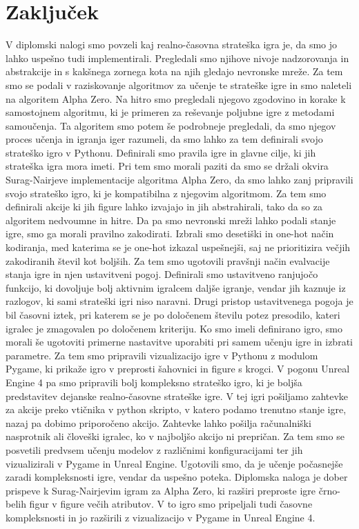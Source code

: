 \documentclass[a4paper, 12pt]{book}
\begin{document}
\chapter{Zaključek}
\label{chzakljucek}
V diplomski nalogi smo povzeli kaj realno-časovna strateška igra je, da smo jo lahko uspešno tudi implementirali.
Pregledali smo njihove nivoje nadzorovanja in abstrakcije in s kakšnega zornega kota na njih gledajo nevronske mreže.
Za tem smo se podali v raziskovanje algoritmov za učenje te strateške igre in smo naleteli na algoritem Alpha Zero.
Na hitro smo pregledali njegovo zgodovino in korake k samostojnem algoritmu, ki je primeren za reševanje poljubne igre z metodami samoučenja.
Ta algoritem smo potem še podrobneje pregledali, da smo njegov proces učenja in igranja iger razumeli, da smo lahko za tem definirali svojo strateško igro v Pythonu.
Definirali smo pravila igre in glavne cilje, ki jih strateška igra mora imeti.
Pri tem smo morali paziti da smo se držali okvira Surag-Nairjeve implementacije algoritma Alpha Zero, da smo lahko zanj pripravili svojo strateško igro, ki je kompatibilna z njegovim algoritmom.
Za tem smo definirali akcije ki jih figure lahko izvajajo in jih abstrahirali, tako da so za algoritem nedvoumne in hitre.
Da pa smo nevronski mreži lahko podali stanje igre, smo ga morali pravilno zakodirati.
Izbrali smo desetiški in one-hot način kodiranja, med katerima se je one-hot izkazal uspešnejši, saj ne prioritizira večjih zakodiranih števil kot boljših.
Za tem smo ugotovili pravšnji način evalvacije stanja igre in njen ustavitveni pogoj.
Definirali smo ustavitveno ranjujočo funkcijo, ki dovoljuje bolj aktivnim igralcem daljše igranje, vendar jih kaznuje iz razlogov, ki sami strateški igri niso naravni.
Drugi pristop ustavitvenega pogoja je bil časovni iztek, pri katerem se je po določenem številu potez presodilo, kateri igralec je zmagovalen po določenem kriteriju.
Ko smo imeli definirano igro, smo morali še ugotoviti primerne nastavitve uporabiti pri samem učenju igre in izbrati parametre.
Za tem smo pripravili vizualizacijo igre v Pythonu z modulom Pygame, ki prikaže igro v preprosti šahovnici in figure s krogci.
V pogonu Unreal Engine 4 pa smo pripravili bolj kompleksno strateško igro, ki je boljša predstavitev dejanske realno-časovne strateške igre.
V tej igri pošiljamo zahtevke za akcije preko vtičnika v python skripto, v katero podamo trenutno stanje igre, nazaj pa dobimo priporočeno akcijo.
Zahtevke lahko pošilja r\textsl{}ačunalniški nasprotnik ali človeški igralec, ko v najboljšo akcijo ni prepričan.
Za tem smo se posvetili predvsem učenju modelov z različnimi konfiguracijami ter jih vizualizirali v Pygame in Unreal Engine.
Ugotovili smo, da je učenje počasnejše zaradi kompleksnosti igre, vendar da uspešno poteka.
Diplomska naloga je dober prispeve k Surag-Nairjevim igram za Alpha Zero, ki razširi preproste igre črno-belih figur v figure večih atributov.
V to igro smo pripeljali tudi časovne kompleksnosti in jo razširili z vizualizacijo v Pygame in Unreal Engine 4.
\end{document}
